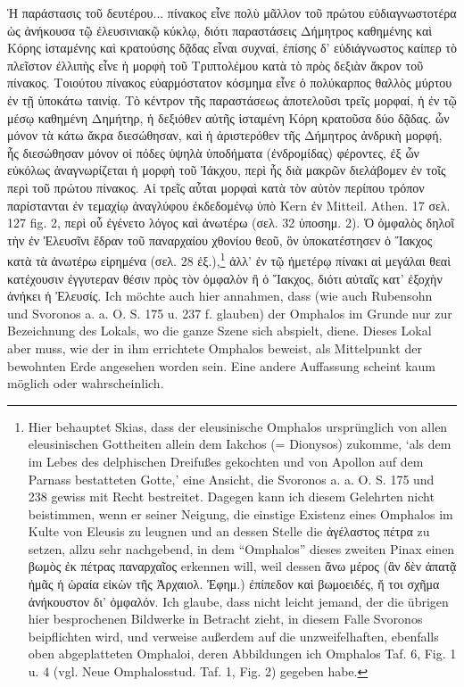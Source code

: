 \documentclass[a4paper, 11pt, oneside]{article}
\begin{document}
Ἡ παράστασις τοῦ δευτέρου... πίνακος εἶνε πολὺ μᾶλλον τοῦ πρώτου εὐδιαγνωστοτέρα ὡς ἀνήκουσα τῷ ἐλευσινιακῷ κύκλῳ, διότι παραστάσεις Δήμητρος καθημένης καὶ Κόρης ἱσταμένης καὶ κρατούσης δᾷδας εἶναι συχναί, ἐπίσης δ' εὐδιάγνωστος καίπερ τὸ πλεῖστον ἐλλιπὴς εἶνε ἡ μορφὴ τοῦ Τριπτολέμου κατὰ τὸ πρὸς δεξιὰν ἄκρον τοῦ πίνακος. Τοιούτου πίνακος εὐαρμόστατον κόσμημα εἶνε ὁ πολύκαρπος θαλλὸς μύρτου ἐν τῇ ὑποκάτω ταινίᾳ. Τὸ κέντρον τῆς παραστάσεως ἀποτελοῦσι τρεῖς μορφαί, ἡ ἐν τῷ μέσῳ καθημένη Δημήτηρ, ἡ δεξιόθεν αὐτῆς ἱσταμένη Κόρη κρατοῦσα δύο δᾷδας. ὧν μόνον τὰ κάτω ἄκρα διεσώθησαν, καὶ ἡ ἀριστερόθεν τῆς Δήμητρος ἀνδρικὴ μορφή, ἧς διεσώθησαν μόνον οἱ πόδες ὑψηλὰ ὑποδήματα (ἐνδρομίδας) φέροντες, ἐξ ὧν εὐκόλως ἀναγνωρίζεται ἡ μορφὴ τοῦ Ἰάκχου, περὶ ἧς διὰ μακρῶν διελάβομεν ἐν τοῖς περὶ τοῦ πρώτου πίνακος. Αἱ τρεῖς αὖται μορφαὶ κατὰ τὸν αὐτὸν περίπου τρόπον παρίστανται ἐν τεμαχίῳ ἀναγλύφου ἐκδεδομένῳ ὑπὸ Kern ἐν Mitteil. Athen. 17 σελ. 127 fig. 2,  περὶ οὗ ἐγένετο λόγος καὶ ἀνωτέρω (σελ. 32 ὑποσημ. 2). Ὁ ὀμφαλὸς δηλοῖ τὴν ἐν Ἐλευσῖνι ἔδραν τοῦ παναρχαίου χθονίου θεοῦ, ὃν ὑποκατέστησεν ὁ Ἴακχος κατὰ τὰ ἀνωτέρω εἰρημένα (σελ. 28 ἐξ.),\footnote{Hier behauptet Skias, dass der eleusinische Omphalos ursprünglich von allen eleusinischen Gottheiten allein dem Iakchos (= Dionysos) zukomme, `als dem im Lebes des delphischen Dreifußes gekochten und von Apollon auf dem Parnass bestatteten Gotte,' eine Ansicht, die Svoronos a. a. O. S. 175 und 238 gewiss mit Recht bestreitet. Dagegen kann ich diesem Gelehrten nicht beistimmen, wenn er seiner Neigung, die einstige Existenz eines Omphalos im Kulte von Eleusis zu leugnen und an dessen Stelle die ἀγέλαστος πέτρα zu setzen, allzu sehr nachgebend, in dem "`Omphalos"' dieses zweiten Pinax einen βωμὸς ἐκ πέτρας παναρχαῖος erkennen will, weil dessen ἄνω μέρος (ἃν δὲν ἀπατᾷ ἡμᾶς ἡ ὡραία εἰκὼν τῆς Ἀρχαιολ. Ἐφημ.) ἐπίπεδον καὶ βωμοειδές, ἤ τοι σχῆμα ἀνήκουστον δι' ὀμφαλόν. Ich glaube, dass nicht leicht jemand, der die übrigen hier besprochenen Bildwerke in Betracht zieht, in diesem Falle Svoronos beipflichten wird, und verweise außerdem auf die unzweifelhaften, ebenfalls oben abgeplatteten Omphaloi, deren Abbildungen ich Omphalos Taf. 6, Fig. 1 u. 4 (vgl. Neue Omphalosstud. Taf. 1, Fig. 2) gegeben habe.} ἀλλ' ἐν τῷ ἡμετέρῳ πίνακι αἱ μεγάλαι θεαὶ κατέχουσιν ἐγγυτεραν θέσιν πρὸς τὸν ὀμφαλὸν ἢ ὁ Ἴακχος, διότι αὐταῖς κατ' ἐξοχὴν ἀνήκει ἡ Ἐλευσίς. Ich möchte auch hier annahmen, dass (wie auch Rubensohn und Svoronos a. a. O. S. 175 u. 237 f. glauben) der Omphalos im Grunde nur zur Bezeichnung des Lokals, wo die ganze Szene sich abspielt, diene. Dieses Lokal aber muss, wie der in ihm errichtete Omphalos beweist, als Mittelpunkt der bewohnten Erde angesehen worden sein. Eine andere Auffassung scheint kaum möglich oder wahrscheinlich.
\end{document}
